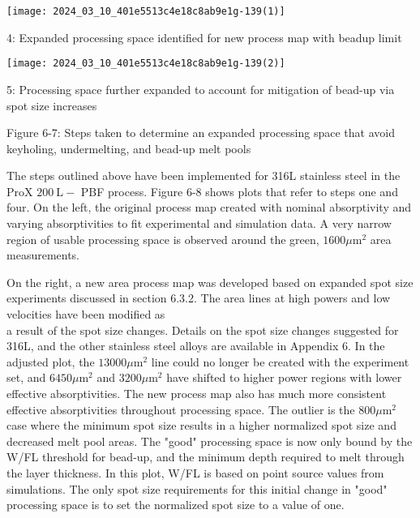 \documentclass[10pt]{article}
\begin{document}
\begin{center}
\texttt{[image: 2024\_03\_10\_401e5513c4e18c8ab9e1g-139(1)]}
\end{center}

4: Expanded processing space identified for new process map with beadup limit

\begin{center}
\texttt{[image: 2024\_03\_10\_401e5513c4e18c8ab9e1g-139(2)]}
\end{center}

5: Processing space further expanded to account for mitigation of bead-up via spot size increases

Figure 6-7: Steps taken to determine an expanded processing space that avoid keyholing, undermelting, and bead-up melt pools

The steps outlined above have been implemented for 316L stainless steel in the ProX $200 \mathrm{~L}-$ PBF process. Figure 6-8 shows plots that refer to steps one and four. On the left, the original process map created with nominal absorptivity and varying absorptivities to fit experimental and simulation data. A very narrow region of usable processing space is observed around the green, $1600 \mu \mathrm{m}^{2}$ area measurements.

On the right, a new area process map was developed based on expanded spot size experiments discussed in section 6.3.2. The area lines at high powers and low velocities have been modified as\\
a result of the spot size changes. Details on the spot size changes suggested for 316L, and the other stainless steel alloys are available in Appendix 6. In the adjusted plot, the $13000 \mu \mathrm{m}^{2}$ line could no longer be created with the experiment set, and $6450 \mu \mathrm{m}^{2}$ and $3200 \mu \mathrm{m}^{2}$ have shifted to higher power regions with lower effective absorptivities. The new process map also has much more consistent effective absorptivities throughout processing space. The outlier is the $800 \mu \mathrm{m}^{2}$ case where the minimum spot size results in a higher normalized spot size and decreased melt pool areas. The "good" processing space is now only bound by the W/FL threshold for bead-up, and the minimum depth required to melt through the layer thickness. In this plot, W/FL is based on point source values from simulations. The only spot size requirements for this initial change in "good" processing space is to set the normalized spot size to a value of one.
\end{document}

